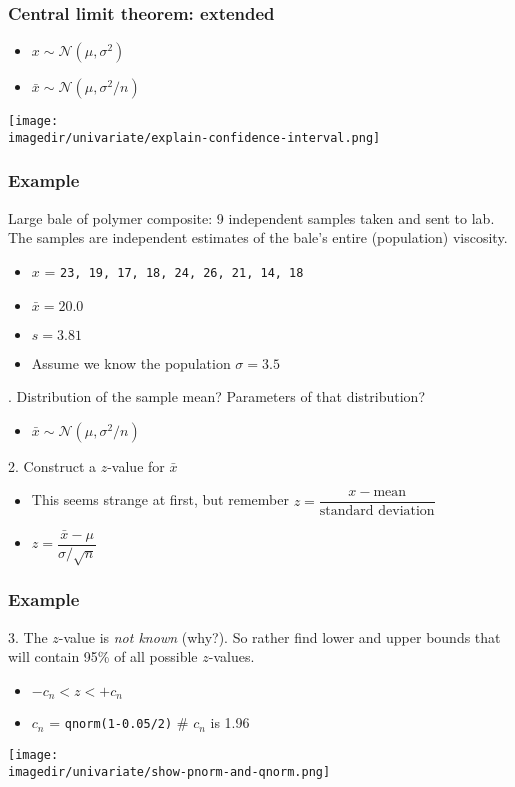 \begin{frame}\frametitle{Central limit theorem: extended}
	\begin{itemize}
		\item	$x \sim \mathcal{N}\left(\mu, \sigma^2 \right)$
		\item	$\bar{x} \sim \mathcal{N}\left(\mu, \sigma^2/n \right)$
	\end{itemize}
	\texttt{[image: \\imagedir/univariate/explain-confidence-interval.png]}
\end{frame}

\begin{frame}\frametitle{Example}

	Large bale of polymer composite: 9 independent samples taken and sent to lab. The samples are independent estimates of the bale's entire (population) viscosity.
	\begin{itemize}
		\item	$x$ = \texttt{23, 19, 17, 18, 24, 26, 21, 14, 18}
		\item	$\bar{x} = 20.0$
		\item	$s=3.81$
		\item	Assume we know the population $\sigma=3.5$
	\end{itemize}
	. Distribution of the sample mean? Parameters of that distribution? 
	\begin{itemize}
		\item$\bar{x} \sim \mathcal{N}\left(\mu, \sigma^2/n \right)$ 
	\end{itemize}
	2. Construct a $z$-value for $\bar{x} $
	\begin{itemize}
		\item	This seems strange at first, but remember $z = \dfrac{x - \text{mean}}{\text{standard deviation}}$
		\item	$z = \dfrac{\bar{x} -\mu}{\sigma/\sqrt{n}}$
	\end{itemize}
\end{frame}

\begin{frame}\frametitle{Example}
	3. The $z$-value is \emph{not known} (why?). So rather find lower and upper bounds that will contain 95\% of all possible $z$-values.
	\begin{itemize}
		\item	$-c_n < z < +c_n$
		\item	$c_n$ = \texttt{qnorm(1-0.05/2)}       \qquad\# $c_n$ is 1.96
	\end{itemize}
	\begin{center}
		\texttt{[image: \\imagedir/univariate/show-pnorm-and-qnorm.png]}
	\end{center}
\end{frame}

